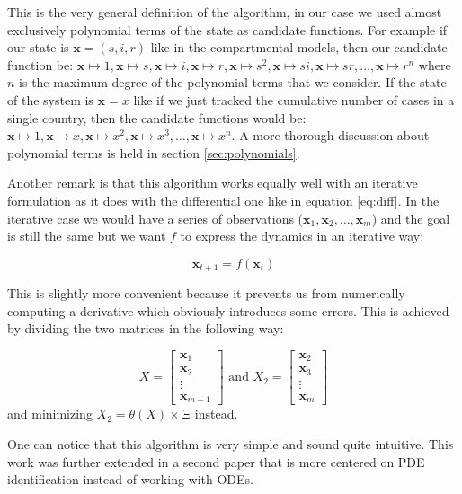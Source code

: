 \documentclass[12pt, letterpaper]{article}
\begin{document}
This is the very general definition of the algorithm, in our case we used almost exclusively polynomial terms of the state as candidate functions. 
For example if our state is $\mathbf{x} = (s, i, r)$ like in the compartmental models, then our candidate function be: 
$\mathbf{x} \mapsto 1,
\mathbf{x} \mapsto s,
\mathbf{x} \mapsto i,
\mathbf{x} \mapsto r,
\mathbf{x} \mapsto s^2,
\mathbf{x} \mapsto si,
\mathbf{x} \mapsto sr,
\dots,
\mathbf{x} \mapsto r^n$ where $n$ is the maximum degree of the polynomial terms that we consider. 
If the state of the system is $\mathbf{x} = x$ like if we just tracked the cumulative number of cases in a single country, then the candidate functions would be: $\mathbf{x} \mapsto 1,
\mathbf{x} \mapsto x,
\mathbf{x} \mapsto x^2,
\mathbf{x} \mapsto x^3,
\dots,
\mathbf{x} \mapsto x^n$. 
A more thorough discussion about polynomial terms is held in section \ref{sec:polynomials}.

Another remark is that this algorithm works equally well with an iterative formulation as it does with the differential one like in equation \ref{eq:diff}.
In the iterative case we would have a series of observations ($\mathbf{x}_1, \mathbf{x}_2, \dots, \mathbf{x}_m$) and the goal is still the same but we want $f$ to express the dynamics in an iterative way:

\begin{equation}\label{eq:it}
\mathbf{x}_{t+1} = f(\mathbf{x}_t)
\end{equation}

This is slightly more convenient because it prevents us from numerically computing a derivative which obviously introduces some errors. This is achieved by dividing the two matrices in the following way:


$$X = 
\begin{bmatrix}
\mathbf{x}_1 \\
\mathbf{x}_2 \\
\vdots \\
\mathbf{x}_{m-1}
\end{bmatrix}
\text{ and }
X_2 =
\begin{bmatrix}
\mathbf{x}_2 \\
\mathbf{x}_3 \\
\vdots \\
\mathbf{x}_m
\end{bmatrix}
$$
and minimizing $X_2 = \theta(X) \times \Xi$ instead.

One can notice that this algorithm is very simple and sound quite intuitive.
This work was further extended in a second paper \cite{sindypde} that is more centered on PDE identification instead of working with ODEs. 
\end{document}
